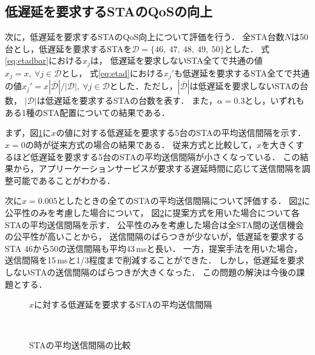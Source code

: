 \documentclass[technicalreport]{ieicej}
\begin{document}
	\subsection{低遅延を要求するSTAのQoSの向上}
	次に，低遅延を要求するSTAのQoS向上について評価を行う．
	全STA台数$N$は50台とし，低遅延を要求するSTAを${\mathcal D}=\{46,\ 47,\ 48,\ 49,\ 50\}$とした．
	式\eqref{eq:etadbar}における$x_j$は，
	低遅延を要求しないSTA全てで共通の値$x_j=x,\ \forall j\in {\overline {\mathcal D}}$とし，
	式\eqref{eq:etad}における$x_j'$も低遅延を要求するSTA全てで共通の値$x_j'=x|{\overline {\mathcal D}}|/|{\mathcal D}|,\ \forall j \in {\mathcal D}$とした．ただし，$|{\overline {\mathcal D}}|$は低遅延を要求しないSTAの台数，
	$|{\mathcal D}|$は低遅延を要求するSTAの台数を表す．
	また，$\alpha=0.3$とし，いずれもある1種のSTA配置についての結果である．
	\par
	まず，図\ref{fig:chnx}に$x$の値に対する低遅延を要求する5台のSTAの平均送信間隔を示す．
	$x=0$の時が従来方式の場合の結果である．
	従来方式と比較して，$x$を大きくするほど低遅延を要求する5台のSTAの平均送信間隔が小さくなっている．
	この結果から，アプリーケーションサービスが要求する遅延時間に応じて送信間隔を調整可能であることがわかる．
	\par
	次に$x=0.005$としたときの全てのSTAの平均送信間隔について評価する．
	図\ref{fig:inter}に公平性のみを考慮した場合について，
	図\ref{fig:inter}に提案方式を用いた場合について各STAの平均送信間隔を示す．
	公平性のみを考慮した場合は全STA間の送信機会の公平性が高いことから，
	送信間隔のばらつきが少ないが，低遅延を要求するSTA 46から50の送信間隔も平均43\,msと長い．
	一方，提案手法を用いた場合，送信間隔を15\,msと1/3程度まで削減することができた．
	しかし，低遅延を要求しないSTAの送信間隔のばらつきが大きくなった．
	この問題の解決は今後の課題とする．

	\begin{figure}[t]
		\centering
		\caption{$x$に対する低遅延を要求するSTAの平均送信間隔}
		\label{fig:chnx}
	\end{figure}

	\begin{figure}[t]
		\centering
		\\
		\caption{STAの平均送信間隔の比較}
		\label{fig:inter}
	\end{figure}
\end{document}
